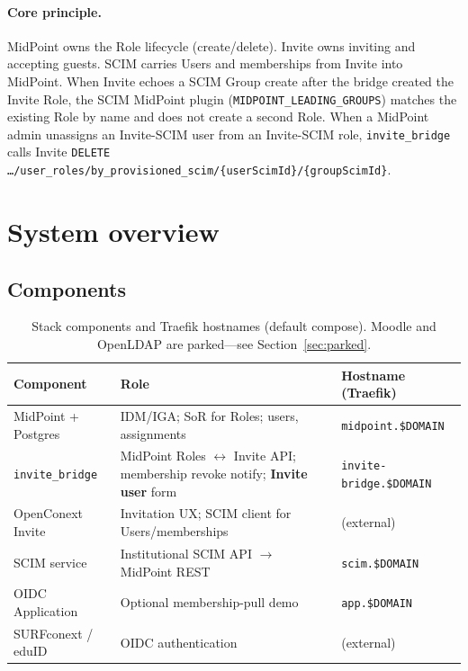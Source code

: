 \documentclass[11pt,a4paper]{article}
\newcommand{\host}[1]{\texttt{#1}}
\begin{document}
\paragraph{Core principle.}
MidPoint owns the Role lifecycle (create/delete). Invite owns inviting and
accepting guests. SCIM carries Users and memberships from Invite into MidPoint.
When Invite echoes a SCIM Group create after the bridge created the Invite Role,
the SCIM MidPoint plugin (\texttt{MIDPOINT\_LEADING\_GROUPS}) matches the
existing Role by name and does not create a second Role.
When a MidPoint admin unassigns an Invite-SCIM user from an Invite-SCIM role,
\texttt{invite\_bridge} calls Invite
\texttt{DELETE \ldots/user\_roles/by\_provisioned\_scim/\{userScimId\}/\{groupScimId\}}.

\section{System overview}

\subsection{Components}

\begin{table}[H]
\centering
\begin{tabularx}{\textwidth}{@{}l X l@{}}
\toprule
\textbf{Component} & \textbf{Role} & \textbf{Hostname (Traefik)} \\
\midrule
MidPoint + Postgres & IDM/IGA; SoR for Roles; users, assignments &
  \host{midpoint.\$DOMAIN} \\
\texttt{invite\_bridge} & MidPoint Roles $\leftrightarrow$ Invite API;
  membership revoke notify; \textbf{Invite user} form &
  \host{invite-bridge.\$DOMAIN} \\
OpenConext Invite & Invitation UX; SCIM client for Users/memberships & (external) \\
SCIM service & Institutional SCIM API $\rightarrow$ MidPoint REST &
  \host{scim.\$DOMAIN} \\
OIDC Application & Optional membership-pull demo &
  \host{app.\$DOMAIN} \\
SURFconext / eduID & OIDC authentication & (external) \\
\bottomrule
\end{tabularx}
\caption{Stack components and Traefik hostnames (default compose).
  Moodle and OpenLDAP are parked---see Section~\ref{sec:parked}.}
\end{table}
\end{document}
